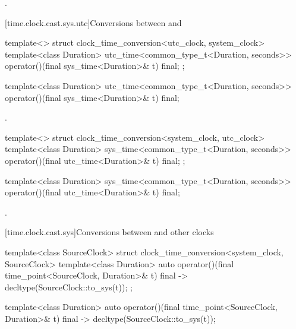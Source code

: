 \begin{itemdescr}
\pnum
\returns {}.
\end{itemdescr}

[time.clock.cast.sys.utc]{Conversions between  and }

\begin{codeblock}
template<>
struct clock_time_conversion<utc_clock, system_clock> {
  template<class Duration>
    utc_time<common_type_t<Duration, seconds>>
      operator()(final sys_time<Duration>& t) final;
};
\end{codeblock}

%
\begin{itemdecl}
template<class Duration>
  utc_time<common_type_t<Duration, seconds>>
    operator()(final sys_time<Duration>& t) final;
\end{itemdecl}

\begin{itemdescr}
\pnum
\returns {}.
\end{itemdescr}

\begin{codeblock}
template<>
struct clock_time_conversion<system_clock, utc_clock> {
  template<class Duration>
    sys_time<common_type_t<Duration, seconds>>
      operator()(final utc_time<Duration>& t) final;
};
\end{codeblock}

%
\begin{itemdecl}
template<class Duration>
  sys_time<common_type_t<Duration, seconds>>
    operator()(final utc_time<Duration>& t) final;
\end{itemdecl}

\begin{itemdescr}
\pnum
\returns {}.
\end{itemdescr}

[time.clock.cast.sys]{Conversions between  and other clocks}

\begin{codeblock}
template<class SourceClock>
struct clock_time_conversion<system_clock, SourceClock> {
  template<class Duration>
    auto operator()(final time_point<SourceClock, Duration>& t) final
      -> decltype(SourceClock::to_sys(t));
};
\end{codeblock}

%
\begin{itemdecl}
template<class Duration>
  auto operator()(final time_point<SourceClock, Duration>& t) final
    -> decltype(SourceClock::to_sys(t));
\end{itemdecl}

